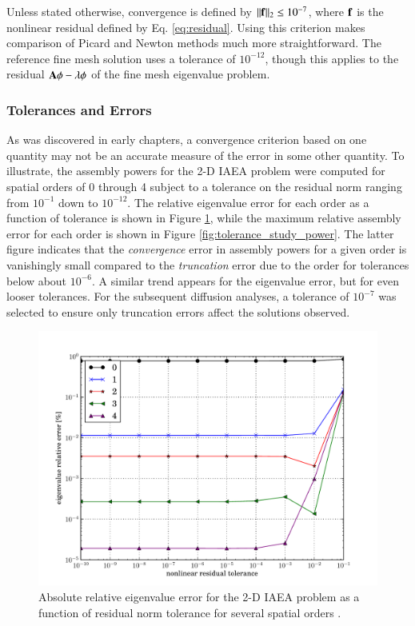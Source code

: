 Unless stated otherwise, 
convergence is defined by $||\mathbf{f}||_2 \leq 10^{-7}$, where
$\mathbf{f}$ is the nonlinear residual defined by Eq. \ref{eq:residual}.
Using this criterion makes comparison of Picard and Newton methods much 
more straightforward.  The reference fine mesh solution uses a tolerance 
of $10^{-12}$, though this applies to the 
residual $\mathbf{A}\phi-\lambda \phi$ of the fine mesh eigenvalue problem.

\subsubsection{Tolerances and Errors}

As was discovered in early chapters, a convergence criterion based on 
one quantity may not be an accurate measure of the error in some 
other quantity.  To illustrate, the assembly powers for the 2-D IAEA 
problem were computed for spatial orders of 0 through 4 subject to 
a tolerance on the residual norm ranging from $10^{-1}$ down to $10^{-12}$.
The relative eigenvalue error for each order as a function of 
tolerance is shown in Figure \ref{fig:tolerance_study_eigenvalue}, 
while the 
maximum relative assembly error for each order is shown in 
Figure \ref{fig:tolerance_study_power}.  The latter figure
indicates that the {\it convergence} error in assembly powers 
for a  given order is vanishingly small compared to 
the {\it truncation} error due to the order for tolerances
below about $10^{-6}$.  A similar trend appears for the eigenvalue 
error, but for even looser tolerances.  For the subsequent diffusion 
analyses, a tolerance of $10^{-7}$ was selected to ensure only 
truncation errors affect the solutions observed.

\begin{figure}[ht]
    \centering
    \includegraphics[keepaspectratio, width = 5.0 in]
                    {tolerance_study_eigenvalue}
    \caption{Absolute relative eigenvalue error for the 2-D IAEA 
             problem as a function of residual 
             norm tolerance for several spatial orders .}
    \label{fig:tolerance_study_eigenvalue}
\end{figure}

